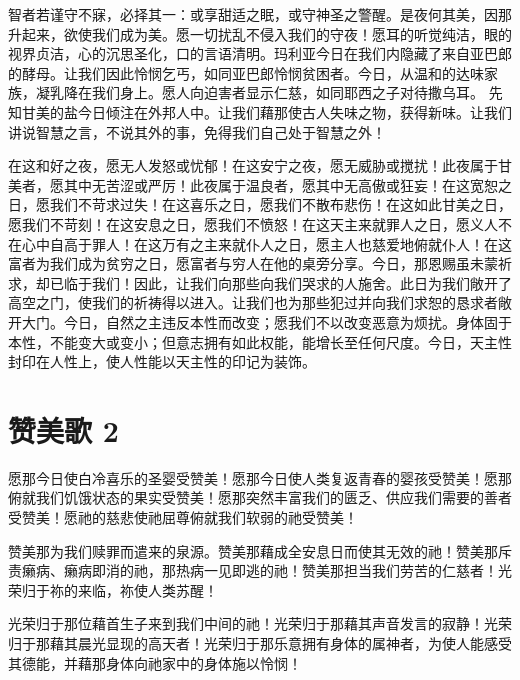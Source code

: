 智者若谨守不寐，必择其一：或享甜适之眠，或守神圣之警醒。是夜何其美，因那 升起来，欲使我们成为美。愿一切扰乱不侵入我们的守夜！愿耳的听觉纯洁，眼的视界贞洁，心的沉思圣化，口的言语清明。玛利亚今日在我们内隐藏了来自亚巴郎的酵母。让我们因此怜悯乞丐，如同亚巴郎怜悯贫困者。今日，从温和的达味家族，凝乳降在我们身上。愿人向迫害者显示仁慈，如同耶西之子对待撒乌耳。 先知甘美的盐今日倾注在外邦人中。让我们藉那使古人失味之物，获得新味。让我们讲说智慧之言，不说其外的事，免得我们自己处于智慧之外！\par

在这和好之夜，愿无人发怒或忧郁！在这安宁之夜，愿无威胁或搅扰！此夜属于甘美者，愿其中无苦涩或严厉！此夜属于温良者，愿其中无高傲或狂妄！在这宽恕之日，愿我们不苛求过失！在这喜乐之日，愿我们不散布悲伤！在这如此甘美之日，愿我们不苛刻！在这安息之日，愿我们不愤怒！在这天主来就罪人之日，愿义人不在心中自高于罪人！在这万有之主来就仆人之日，愿主人也慈爱地俯就仆人！在这富者为我们成为贫穷之日，愿富者与穷人在他的桌旁分享。今日，那恩赐虽未蒙祈求，却已临于我们！因此，让我们向那些向我们哭求的人施舍。此日为我们敞开了高空之门，使我们的祈祷得以进入。让我们也为那些犯过并向我们求恕的恳求者敞开大门。今日，自然之主违反本性而改变；愿我们不以改变恶意为烦扰。身体固于本性，不能变大或变小；但意志拥有如此权能，能增长至任何尺度。今日，天主性封印在人性上，使人性能以天主性的印记为装饰。\par


\section{赞美歌 2}

愿那今日使白冷喜乐的圣婴受赞美！愿那今日使人类复返青春的婴孩受赞美！愿那俯就我们饥饿状态的果实受赞美！愿那突然丰富我们的匮乏、供应我们需要的善者受赞美！愿祂的慈悲使祂屈尊俯就我们软弱的祂受赞美！\par

赞美那为我们赎罪而遣来的泉源。赞美那藉成全安息日而使其无效的祂！赞美那斥责癞病、癞病即消的祂，那热病一见即逃的祂！赞美那担当我们劳苦的仁慈者！光荣归于祢的来临，祢使人类苏醒！\par

光荣归于那位藉首生子来到我们中间的祂！光荣归于那藉其声音发言的寂静！光荣归于那藉其晨光显现的高天者！光荣归于那乐意拥有身体的属神者，为使人能感受其德能，并藉那身体向祂家中的身体施以怜悯！\par

